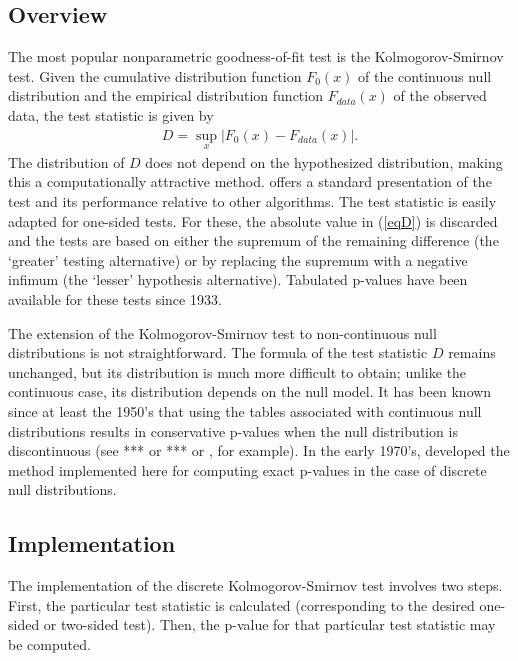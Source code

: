 
\subsection{Overview}

The most popular nonparametric goodness-of-fit test is the
Kolmogorov-Smirnov test.
Given the cumulative distribution
function $F_0(x)$ of the continuous null distribution
and the empirical distribution function $F_{data}(x)$ of the observed data,  the test statistic is given by
\begin{align}
D = \sup_x \left| F_0(x)- F_{data}(x) \right|.    \label{eqD}
\end{align}
The distribution of $D$ does not depend on the hypothesized
distribution, making this a computationally
attractive method. \cite{slakter65} offers a standard presentation
of the test and its
performance relative to other algorithms. 
The test statistic is easily adapted for one-sided tests.
For these, the absolute value in (\ref{eqD}) is discarded and the tests are based
on either the supremum of the remaining difference (the `greater' testing
alternative) or by replacing the supremum with a negative infimum
(the `lesser' hypothesis alternative).  Tabulated p-values have been
available for these tests since 1933. %


The extension of the Kolmogorov-Smirnov test to non-continuous 
null distributions is not straightforward. The formula of
the test statistic $D$ remains unchanged, but its distribution
is much more difficult to obtain; unlike the 
continuous case, its distribution depends on the null model.
It has been known since at least the 1950's that using the tables associated
with continuous null distributions results in conservative p-values
when the null distribution is discontinuous 
(see *** or *** or \citet{stephens1974}, for example).  In the early 1970's, 
\citet{Conover1972} developed the method implemented here
for computing exact p-values
in the case of discrete null distributions.

\subsection{Implementation}

The implementation of the discrete Kolmogorov-Smirnov test involves
two steps. First, the particular test statistic is calculated
(corresponding to the desired one-sided or two-sided test).
Then, the p-value for that particular test statistic may be computed. 

